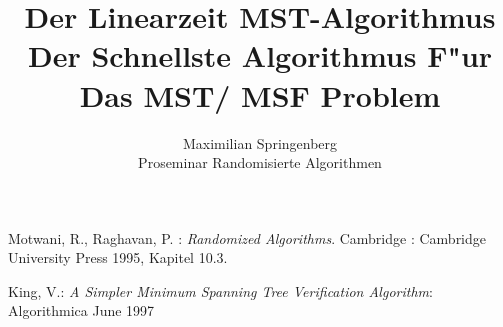 \documentclass[a4paper,12pt,times,german]{cls/summary}
\title{Der Linearzeit MST-Algorithmus\\
       \LARGE Der Schnellste Algorithmus F"ur Das MST/ MSF Problem}
\author{Maximilian Springenberg\\
        \small Proseminar Randomisierte Algorithmen}
\date{}
\begin{document}
\maketitle







\begin{thebibliography}{}
\footnotesize
{} 
    Motwani, R., Raghavan, P. :
    \textit{Randomized Algorithms}. Cambridge :
    Cambridge University Press 1995, Kapitel 10.3.

    King, V.:
    \textit{A Simpler Minimum Spanning Tree Verification Algorithm}:
    Algorithmica June 1997
\end{thebibliography}

%
\end{document}
